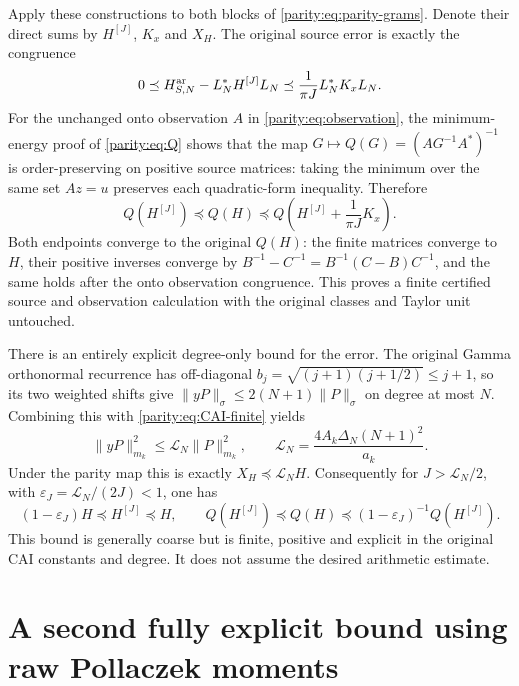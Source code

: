 \documentclass[11pt]{article}
\begin{document}
Apply these constructions to both blocks of
\eqref{parity:eq:parity-grams}. Denote their direct sums by $H^{[J]}$,
$K_x$ and $X_H$. The original source error is exactly the
congruence
\[
 0\preceq H_{S,N}^{\rm ar}-L_N^*H^{[J]}L_N
       \preceq\frac1{\pi J}L_N^*K_xL_N.
\]
For the unchanged onto observation $A$ in \eqref{parity:eq:observation},
the minimum-energy proof of \eqref{parity:eq:Q} shows that the map
$G\mapsto Q(G)=(AG^{-1}A^*)^{-1}$ is order-preserving on positive
source matrices: taking the minimum over the same set $Az=u$
preserves each quadratic-form inequality. Therefore
\begin{equation}\label{parity:eq:Q-bracket}
 \boxed{Q(H^{[J]})\preceq Q(H)\preceq
 Q\left(H^{[J]}+\frac1{\pi J}K_x\right).}
\end{equation}
Both endpoints converge to the original $Q(H)$: the finite
matrices converge to $H$, their positive inverses converge by
$B^{-1}-C^{-1}=B^{-1}(C-B)C^{-1}$, and the same holds after
the onto observation congruence. This proves a finite certified
source and observation calculation with the original classes and
Taylor unit untouched.

There is an entirely explicit degree-only bound for the error.
The original Gamma orthonormal recurrence has off-diagonal
$b_j=\sqrt{(j+1)(j+1/2)}\leq j+1$, so its two weighted shifts
give $\|yP\|_\sigma\leq2(N+1)\|P\|_\sigma$ on degree at most $N$.
Combining this with \eqref{parity:eq:CAI-finite} yields
\begin{equation}\label{parity:eq:L-bound}
 \|yP\|_{m_k}^2\leq\mathcal L_N\|P\|_{m_k}^2,
 \qquad \mathcal L_N=
       \frac{4A_k\Delta_N(N+1)^2}{a_k}.
\end{equation}
Under the parity map this is exactly $X_H\preceq\mathcal L_NH$.
Consequently for $J>\mathcal L_N/2$, with
$\varepsilon_J=\mathcal L_N/(2J)<1$, one has
\begin{equation}\label{parity:eq:relative}
 (1-\varepsilon_J)H\preceq H^{[J]}\preceq H,
 \qquad
 Q(H^{[J]})\preceq Q(H)
       \preceq(1-\varepsilon_J)^{-1}Q(H^{[J]}).
\end{equation}
This bound is generally coarse but is finite, positive and
explicit in the original CAI constants and degree. It does not
assume the desired arithmetic estimate.

\section{A second fully explicit bound using raw Pollaczek moments}
\end{document}
